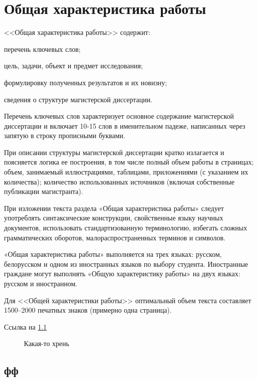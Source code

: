 \documentclass{mpaper}
\begin{document}
    \chapter{Общая характеристика работы}
    <<Общая характеристика работы>> содержит:

    перечень ключевых слов;

    цель, задачи, объект и предмет исследования;

    формулировку полученных результатов и их новизну;

    сведения о структуре магистерской диссертации.

    Перечень ключевых слов характеризует основное содержание магистерской диссертации и включает 10-15 слов в именительном падеже, написанных через запятую в строку прописными буквами.

    При описании структуры магистерской диссертации кратко излагается и поясняется логика ее построения, в том числе полный объем работы в страницах; объем, занимаемый иллюстрациями, таблицами, приложениями (с указанием их количества); количество использованных источников (включая собственные публикации магистранта).

    При изложении текста раздела «Общая характеристика работы»
    следует употреблять синтаксические конструкции, свойственные языку
    научных документов, использовать стандартизованную терминологию,
    избегать сложных грамматических оборотов, малораспространенных
    терминов и символов.

    «Общая характеристика работы» выполняется на трех языках: русском, белорусском и одном из иностранных языков по выбору студента. Иностранные граждане могут выполнять «Общую характеристику работы» на двух языках: русском и иностранном.

    Для <<Общей характеристики работы>> оптимальный объем текста составляет 1500--2000 печатных знаков (примерно одна страница).
    
    Ссылка на \cref{fig:1}
    \begin{figure}
        \centering
        \caption{Какая-то хрень}\label{fig:1}
    \end{figure}

    \section{фф}
\end{document}
